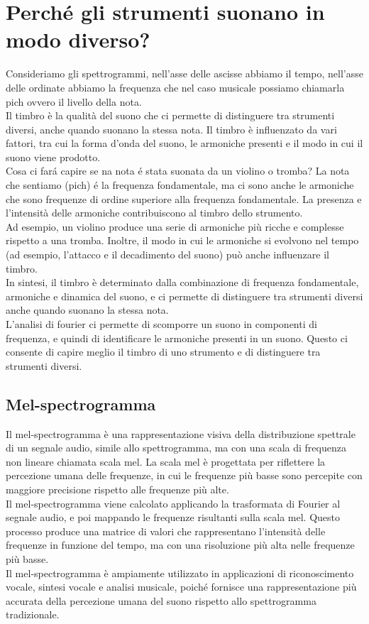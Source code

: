\section{Perché gli strumenti suonano in modo diverso?}
Consideriamo gli spettrogrammi, nell'asse delle ascisse abbiamo il tempo, nell'asse delle ordinate abbiamo la frequenza che nel caso musicale possiamo chiamarla pich ovvero il livello della nota.\\
Il timbro è la qualità del suono che ci permette di distinguere tra strumenti diversi, anche quando suonano la stessa nota. Il timbro è influenzato da vari fattori, tra cui la forma d'onda del suono, le armoniche presenti e il modo in cui il suono viene prodotto.\\

Cosa ci fará capire se na nota é stata suonata da un violino o tromba? La nota che sentiamo (pich) é la frequenza fondamentale, ma ci sono anche le armoniche che sono frequenze di ordine superiore alla frequenza fondamentale. La presenza e l'intensità delle armoniche contribuiscono al timbro dello strumento.\\
Ad esempio, un violino produce una serie di armoniche più ricche e complesse rispetto a una tromba. Inoltre, il modo in cui le armoniche si evolvono nel tempo (ad esempio, l'attacco e il decadimento del suono) può anche influenzare il timbro.\\
In sintesi, il timbro è determinato dalla combinazione di frequenza fondamentale, armoniche e dinamica del suono, e ci permette di distinguere tra strumenti diversi anche quando suonano la stessa nota.\\

L'analisi di fourier ci permette di scomporre un suono in componenti di frequenza, e quindi di identificare le armoniche presenti in un suono. Questo ci consente di capire meglio il timbro di uno strumento e di distinguere tra strumenti diversi.\\

\subsection{Mel-spectrogramma}
Il mel-spectrogramma è una rappresentazione visiva della distribuzione spettrale di un segnale audio, simile allo spettrogramma, ma con una scala di frequenza non lineare chiamata scala mel. La scala mel è progettata per riflettere la percezione umana delle frequenze, in cui le frequenze più basse sono percepite con maggiore precisione rispetto alle frequenze più alte.\\
Il mel-spectrogramma viene calcolato applicando la trasformata di Fourier al segnale audio, e poi mappando le frequenze risultanti sulla scala mel. Questo processo produce una matrice di valori che rappresentano l'intensità delle frequenze in funzione del tempo, ma con una risoluzione più alta nelle frequenze più basse.\\
Il mel-spectrogramma è ampiamente utilizzato in applicazioni di riconoscimento vocale, sintesi vocale e analisi musicale, poiché fornisce una rappresentazione più accurata della percezione umana del suono rispetto allo spettrogramma tradizionale.\\

